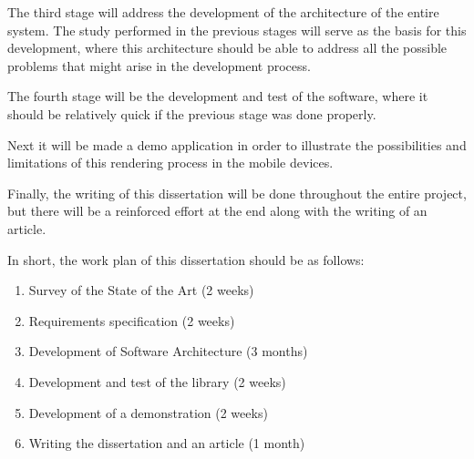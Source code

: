 \par
The third stage will address the development of the architecture of the entire system.
The study performed in the previous stages will serve as the basis for this development, where this architecture should be able to address all the possible problems that might arise in the development process.

\par
The fourth stage will be the development and test of the software, where it should be relatively quick if the previous stage was done properly.

\par
Next it will be made a demo application in order to illustrate the possibilities and limitations of this rendering process in the mobile devices.

\par
Finally, the writing of this dissertation will be done throughout the entire project, but there will be a reinforced effort at the end along with the writing of an article.

\par
In short, the work plan of this dissertation should be as follows:

\begin{enumerate}

\item Survey of the State of the Art (2 weeks)
\item Requirements specification (2 weeks)
\item Development of Software Architecture (3 months)
\item Development and test of the library (2 weeks)
\item Development of a demonstration (2 weeks)
\item Writing the dissertation and an article (1 month)

\end{enumerate}

